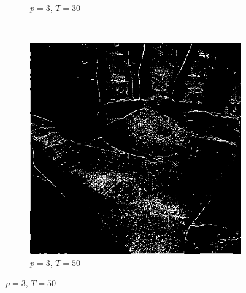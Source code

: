 \documentclass{article}
\begin{document}
\begin{enumerate}[label=(\alph*)]
\begin{figure}
\begin{subfigure}[b]{0.3\textwidth}
            \caption{$p = 3$, $T = 30$}
        \end{subfigure}
        ~
        \begin{subfigure}[b]{0.3\textwidth}
            \includegraphics[width=\textwidth]{img/ED1_3_50.png}
            \caption{$p = 3$, $T = 50$}
        \end{subfigure}
        
        

\end{figure}
\end{enumerate}
\end{document}
